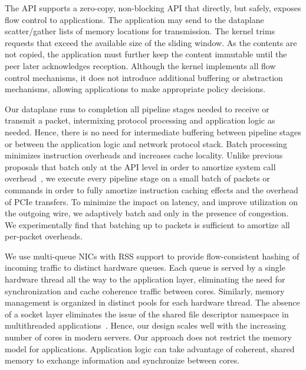  The API supports a zero-copy,
non-blocking API that directly, but safely, exposes flow control to
applications. The application may send to the dataplane scatter/gather
lists of memory locations for transmission.  The kernel trims requests
that exceed the available size of the sliding window. As the contents
are not copied, the application must further keep the content
immutable until the peer later acknowledges reception.  Although
the kernel implements all flow control mechanisms, it does not
introduce additional buffering or abstraction mechanisms, allowing
applications to make appropriate policy decisions.


 Our dataplane
runs to completion all pipeline stages needed to receive or transmit a
packet, intermixing protocol processing and application logic as
needed. Hence, there is no need for intermediate buffering between
pipeline stages or between the application logic and network protocol
stack. Batch processing minimizes instruction overheads and increases
cache locality.  Unlike previous proposals that batch only at the API
level in order to amortize system call
overhead~\cite{jeong2014mtcp,han2012megapipe}, we execute every
pipeline stage on a small batch of packets or commands in order to
fully amortize instruction caching effects and the overhead of PCIe
transfers.  To minimize the impact on latency, and improve utilization
on the outgoing wire, we adaptively batch and only in the presence of
congestion. We experimentally find that batching up to 
packets is sufficient to amortize all per-packet overheads.




 We use multi-queue
NICs with RSS support to provide flow-consistent hashing of incoming
traffic to distinct hardware queues. Each queue is served by a single
hardware thread all the way to the application layer, eliminating the
need for synchronization and cache coherence traffic between
cores. Similarly, memory management is organized in distinct pools for
each hardware thread. The absence of a socket layer eliminates the
issue of the shared file descriptor namespace in multithreaded applications~\cite{DBLP:conf/sosp/ClementsKZMK13}. Hence,
our design scales well with the increasing number of cores in modern
servers. Our approach does not restrict the memory model for
applications. Application logic can take advantage of coherent, shared
memory to exchange information and synchronize between cores. 


